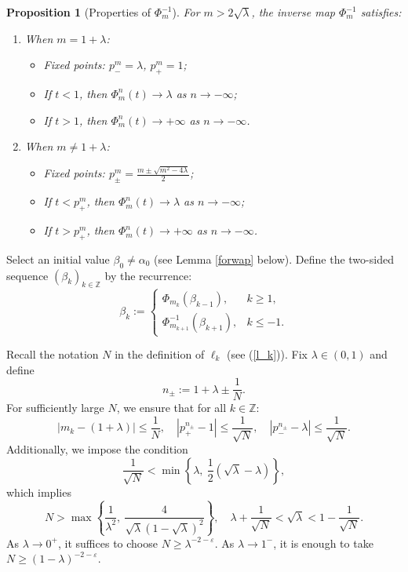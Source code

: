 \documentclass{amsart}
\newtheorem{Proposition}[Definition]{Proposition}
\theoremstyle{definition}
\begin{document}
\begin{Proposition}[Properties of $\Phi^{-1}_m$]
For $m > 2\sqrt{\lambda}$, the inverse map $\Phi^{-1}_m$ satisfies:
\begin{enumerate}
    \item When $m = 1 + \lambda$:
    \begin{itemize}
        \item Fixed points: $p^m_- = \lambda$, $p^m_+ = 1$;
        \item If $t < 1$, then $\Phi_m^n(t) \to \lambda$ as $n \to -\infty$;
        \item If $t > 1$, then $\Phi_m^n(t) \to +\infty$ as $n \to -\infty$.
    \end{itemize}
    \item When $m \neq 1 + \lambda$:
    \begin{itemize}
        \item Fixed points: $p^m_\pm = \frac{m \pm \sqrt{m^2 - 4\lambda}}{2}$;
        \item If $t < p^m_+$, then $\Phi_m^n(t) \to \lambda$ as $n \to -\infty$;
        \item If $t > p^m_+$, then $\Phi_m^n(t) \to +\infty$ as $n \to -\infty$.
    \end{itemize}
\end{enumerate}
\end{Proposition}

Select an initial value $\beta_0 \neq \alpha_0$ (see Lemma \ref{forwap} below). Define the two-sided sequence $(\beta_k)_{k \in \mathbb{Z}}$ by the recurrence:
\[
\beta_k :=
\begin{cases}
\Phi_{m_k}(\beta_{k-1}), & k \geq 1, \\
\Phi^{-1}_{m_{k+1}}(\beta_{k+1}), & k \leq -1.
\end{cases}
\]

Recall the notation $N$ in the definition of $\ell_k$ (see (\ref{l_k})). Fix $\lambda \in (0,1)$ and define
\[
n_{\pm} := 1 + \lambda \pm \frac{1}{N}.
\]
For sufficiently large $N$, we ensure that for all $k \in \mathbb{Z}$:
\begin{equation}\label{mppp}
|m_k - (1 + \lambda)| \leq \frac{1}{N}, \quad
|p^{n_{\pm}}_+ - 1| \leq \frac{1}{\sqrt{N}}, \quad
|p^{n_{\pm}}_- - \lambda| \leq \frac{1}{\sqrt{N}}.
\end{equation}
Additionally, we impose the condition
\begin{equation}\label{lacond}
\frac{1}{\sqrt{N}} < \min\left\{\lambda,\ \frac{1}{2}(\sqrt{\lambda} - \lambda)\right\},
\end{equation}
which implies
\[
N > \max\left\{\frac{1}{\lambda^2},\ \frac{4}{\sqrt{\lambda}(1 - \sqrt{\lambda})^2}\right\}, \quad
\lambda + \frac{1}{\sqrt{N}} < \sqrt{\lambda} < 1 - \frac{1}{\sqrt{N}}.
\]
As $\lambda \to 0^+$, it suffices to choose $N \geq \lambda^{-2 - \varepsilon}$. As $\lambda \to 1^-$, it is enough to take $N \geq (1 - \lambda)^{-2 - \varepsilon}$.
\end{document}
